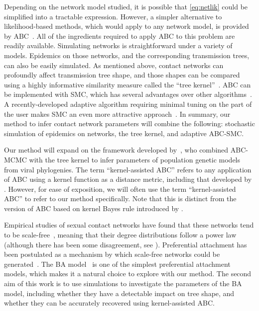 Depending on the network model studied, it is possible that \cref{eq:netlik}
could be simplified into a tractable expression. However, a simpler alternative
to likelihood-based methods, which would apply to any network model, is
provided by \gls{ABC}~\autocite{rubin1984bayesianly, tavare1997inferring,
fu1997estimating, beaumont2002approximate}. All of the ingredients required to
apply \gls{ABC} to this problem are readily available. Simulating networks is
straightforward under a variety of models. Epidemics on those networks, and the
corresponding transmission trees, can also be easily simulated. As mentioned
above, contact networks can profoundly affect transmission tree shape, and
those shapes can be compared using a highly informative similarity measure
called the ``tree kernel''~\autocite{poon2013mapping}. \Gls{ABC} can be
implemented with \gls{SMC}, which has several advantages over other
algorithms~\autocite{mckinley2009inference}. A recently-developed adaptive
algorithm requiring minimal tuning on the part of the user makes \gls{SMC} an
even more attractive approach~\autocite{del2012adaptive}. In summary, our
method to infer contact network parameters will combine the following:
stochastic simulation of epidemics on networks, the tree kernel, and adaptive
\gls{ABC}-\gls{SMC}. 

Our method will expand on the framework developed
by~\autocite{poon2015phylodynamic}, who combined \gls{ABC}-\gls{MCMC} with the
tree kernel to infer parameters of population genetic models from viral
phylogenies. The term ``kernel-assisted \gls{ABC}'' refers to any application
of \gls{ABC} using a kernel function as a distance metric, including that
developed by \citeauthor{poon2015phylodynamic}. However, for ease of
exposition, we will often use the term ``kernel-assisted \gls{ABC}'' to refer
to our method specifically. Note that this is distinct from the version of
\gls{ABC} based on kernel Bayes rule introduced by
\textcite{fukumizu2011kernel}.

Empirical studies of sexual contact networks have found that these networks
tend to be scale-free~\autocite{colgate1989risk, liljeros2001web,
schneeberger2004scale,clemenccon2015statistical}, meaning that their degree
distributions follow a power law (although there has been some disagreement,
see \autocite{handcock2004likelihood, bansal2007individual}). Preferential
attachment has been postulated as a mechanism by which scale-free networks
could be generated~\autocite{barabasi1999emergence}. The \gls{BA}
model~\autocite{barabasi1999emergence} is one of the simplest preferential
attachment models, which makes it a natural choice to explore with our method.
The second aim of this work is to use simulations to investigate the parameters
of the \gls{BA} model, including whether they have a detectable impact on tree
shape, and whether they can be accurately recovered using kernel-assisted
\gls{ABC}.

